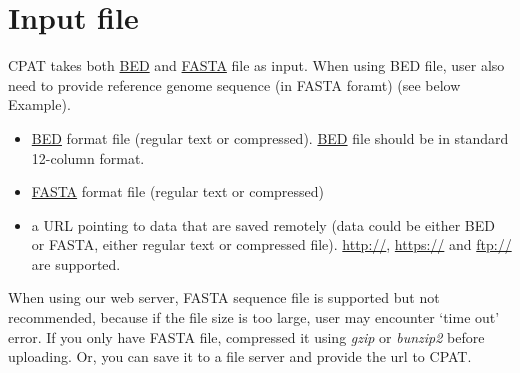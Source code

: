 \documentclass[letterpaper,10pt,english]{sphinxmanual}
\begin{document}
\section{Input file}
\label{index:input-file}
CPAT takes both \href{http://dldcc-web.brc.bcm.edu/lilab/liguow/CGI/cpat/dat/human\_test.bed}{BED} and
\href{http://dldcc-web.brc.bcm.edu/lilab/liguow/CGI/cpat/dat/human\_test.mRNA.fa}{FASTA} file as input.
When using BED file, user also need to provide reference genome sequence (in FASTA foramt)
(see below Example).
\begin{itemize}
\item {} 
\href{http://dldcc-web.brc.bcm.edu/lilab/liguow/CGI/cpat/dat/human\_test.bed}{BED} format file (regular text or compressed). \href{http://dldcc-web.brc.bcm.edu/lilab/liguow/CGI/cpat/dat/human\_test.bed}{BED} file should be in standard 12-column format.

\item {} 
\href{http://dldcc-web.brc.bcm.edu/lilab/liguow/CGI/cpat/dat/human\_test.mRNA.fa}{FASTA} format file (regular text or compressed)

\item {} 
a URL pointing to data that are saved remotely (data could be either BED or FASTA, either regular text or compressed file). \href{http://}{http://}, \href{https://}{https://} and \href{ftp://}{ftp://} are supported.

\end{itemize}

When using our web server, FASTA sequence file is supported but not recommended, because if the file
size is too large, user may encounter `time out' error. If you only have FASTA file, compressed
it using \emph{gzip} or \emph{bunzip2} before uploading. Or, you can save it to a file server and provide
the url to CPAT.
\end{document}
